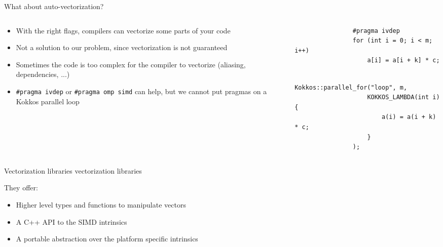 \documentclass[
    aspectratio=169,
    \createHandout
]{beamer}
\begin{document}
\begin{frame}[fragile]{What about auto-vectorization?}
    \begin{columns}
        \begin{column}{0.5\linewidth}
            \begin{itemize}
                \item With the right flags, compilers can vectorize some parts of your code
                \item Not a solution to our problem, since vectorization is not guaranteed
                \item Sometimes the code is too complex for the compiler to vectorize (aliasing, dependencies, ...)
                \item \texttt{\#pragma ivdep} or \texttt{\#pragma omp simd} can help, but we cannot put pragmas on a Kokkos parallel loop
            \end{itemize}
        \end{column}
        \begin{column}{0.5\linewidth}
            \begin{verbatim}
                #pragma ivdep
                for (int i = 0; i < m; i++)
                    a[i] = a[i + k] * c;
            \end{verbatim}
            \begin{verbatim}
                Kokkos::parallel_for("loop", m,
                    KOKKOS_LAMBDA(int i) {
                        a(i) = a(i + k) * c;
                    }
                );
            \end{verbatim}
        \end{column}
    \end{columns}
\end{frame}

\begin{frame}[fragile]{Vectorization libraries}
     vectorization libraries

    \vspace{10pt}

    They offer:
    \begin{itemize}
        \item Higher level types and functions to manipulate vectors
        \item A C++ API to the SIMD intrinsics
        \item A portable abstraction over the platform specific intrinsics
    \end{itemize}
\end{frame}
\end{document}
